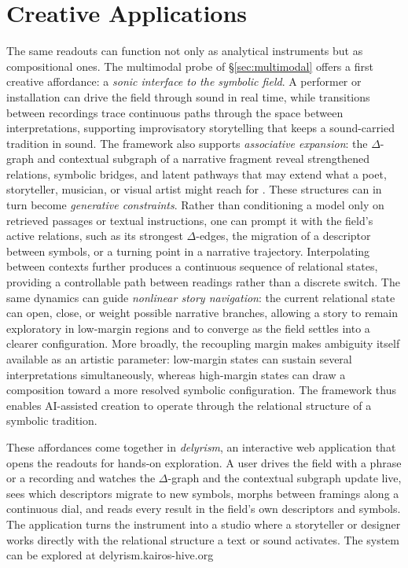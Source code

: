 \documentclass[final,creativeai]{article}
\begin{document}
\section{Creative Applications}
The same readouts can function not only as analytical instruments but as compositional ones. The multimodal probe of \S\ref{sec:multimodal} offers a first creative affordance: a \emph{sonic interface to the symbolic field}. A performer or installation can drive the field through sound in real time, while transitions between recordings trace continuous paths through the space between interpretations, supporting improvisatory storytelling that keeps a sound-carried tradition in sound. The framework also supports \emph{associative expansion}: the $\Delta$-graph and contextual subgraph of a narrative fragment reveal strengthened relations, symbolic bridges, and latent pathways that may extend what a poet, storyteller, musician, or visual artist might reach for \citep{varshney_associative_2016, gross_lexical_2012, rick_supermind_2023}. These structures can in turn become \emph{generative constraints}. Rather than conditioning a model only on retrieved passages or textual instructions, one can prompt it with the field's active relations, such as its strongest $\Delta$-edges, the migration of a descriptor between symbols, or a turning point in a narrative trajectory. Interpolating between contexts further produces a continuous sequence of relational states, providing a controllable path between readings rather than a discrete switch. The same dynamics can guide \emph{nonlinear story navigation}: the current relational state can open, close, or weight possible narrative branches, allowing a story to remain exploratory in low-margin regions and to converge as the field settles into a clearer configuration. More broadly, the recoupling margin makes ambiguity itself available as an artistic parameter: low-margin states can sustain several interpretations simultaneously, whereas high-margin states can draw a composition toward a more resolved symbolic configuration. The framework thus enables AI-assisted creation to operate through the relational structure of a symbolic tradition.

These affordances come together in \emph{delyrism}, an interactive web application that opens the readouts for hands-on exploration. A user drives the field with a phrase or a recording and watches the $\Delta$-graph and the contextual subgraph update live, sees which descriptors migrate to new symbols, morphs between framings along a continuous dial, and reads every result in the field's own descriptors and symbols. The application turns the instrument into a studio where a storyteller or designer works directly with the relational structure a text or sound activates. The system can be explored at delyrism.kairos-hive.org
\end{document}
